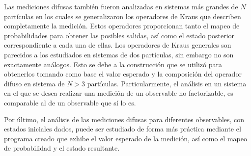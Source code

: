 Las mediciones difusas también fueron analizadas en sistemas más grandes de $N$
partículas en los cuales se generalizaron los operadores de Kraus que describen
completamente la medición. Estos operadores proporcionan tanto el mapeo de
probabilidades para obtener las posibles salidas, así como el estado posterior
correspondiente a cada una de ellas. Los operadores de Kraus generales son
parecidos a los estudiados en sistemas de dos partículas, sin embargo no son
exactamente análogos. Esto se debe a la construcción que se utilizó para
obtenerlos tomando como base el valor esperado y la composición del operador
difuso en sistema de $N>3$ partículas. Particularmente, el análisis en un
sistema en el que se desea realizar una medición de un observable no
factorizable, es comparable al de un observable que sí lo es.


Por último, el análisis de las mediciones difusas para diferentes observables,
con estados iniciales dados, puede ser estudiado de forma más práctica mediante
el programa creado que exhibe el valor esperado de la medición, así como el
mapeo de probabilidad y el estado resultante.

